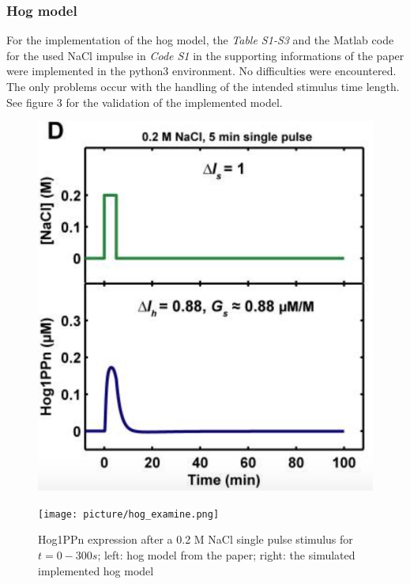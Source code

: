 \subsubsection{Hog model}
For the implementation of the hog model, the \textit{Table S1-S3} and the Matlab code for the used NaCl impulse in \textit{Code S1 } in the supporting informations of the paper were implemented in the python3 environment. No difficulties were encountered. The only problems occur with the handling of the intended stimulus time length. See figure 3 for the validation of the implemented model.\newpage

\begin{figure}[h!]
	
	\begin{minipage}{0,5\textwidth}
		
		\includegraphics[width=\textwidth]{picture/Hog_Paper.png}
		
		\label{hogPaper} 
	\end{minipage}
	\begin{minipage}{0,5\textwidth}
		
		\texttt{[image: picture/hog\_examine.png]}
		
		
	\end{minipage}
	\label{hogImplemented} 
	\caption{Hog1PPn expression after a 0.2 M NaCl single pulse stimulus for $t=0-300s$; left: hog model from the paper; right: the simulated implemented hog model}
\end{figure}

